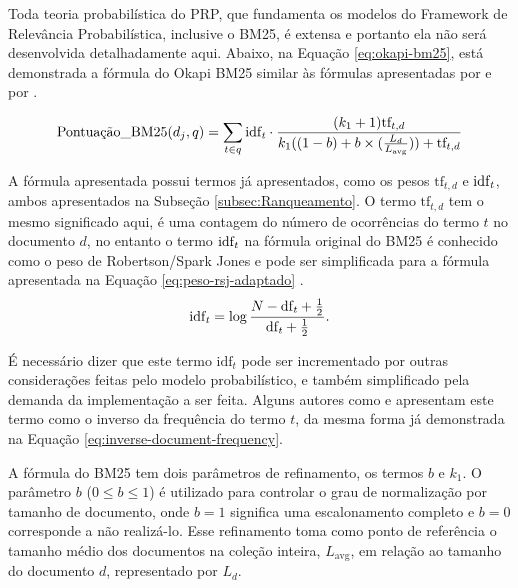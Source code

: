         Toda teoria probabilística do PRP, que fundamenta os modelos do Framework de Relevância Probabilística, inclusive o BM25, é extensa e portanto ela não será  desenvolvida detalhadamente aqui.
        Abaixo, na Equação \ref{eq:okapi-bm25}, está demonstrada a fórmula do Okapi BM25 similar às fórmulas apresentadas por  e por .
        
        \begin{equation}
            \label{eq:okapi-bm25}
    		\text{Pontuação\_BM25}(d_j, q) = \sum_{t \in q} \text{idf}_{\text{\textit{t}}} 
    		\cdot
    		\frac{(k_1 + 1) \text{tf}_{t,d}}{k_1((1-b)+b \times (\frac{L_d}{L_{\text{avg}}})) + \text{tf}_{t,d}} 
        \end{equation}
    
        A fórmula apresentada possui termos já apresentados, como os pesos $\text{tf}_{t,d}$ e $\text{idf}_{\text{\textit{t}}}$, ambos apresentados na Subseção \ref{subsec:Ranqueamento}.
        O termo $\text{tf}_{t,d}$ tem o mesmo significado aqui, é uma contagem do número de ocorrências do termo $t$ no documento $d$, no entanto o termo $\text{idf}_{\text{\textit{t}}}$ na fórmula original do BM25 é conhecido como o peso de Robertson/Spark Jones e pode ser simplificada para a fórmula apresentada na Equação \ref{eq:peso-rsj-adaptado} \cite[p.~347--349]{robertson_probabilistic_2010}.
        \begin{equation}
            \label{eq:peso-rsj-adaptado}
    		\text{idf}_{\text{\textit{t}}} = \log{\frac{N-\text{df}_{\text{\textit{t}}}+\frac{1}{2}}{\text{df}_{\text{\textit{t}}} + \frac{1}{2} }}.
        \end{equation}
        
        É necessário dizer que este termo $\text{idf}_{t}$ pode ser incrementado por outras considerações feitas pelo modelo probabilístico, e também simplificado pela demanda da implementação a ser feita.
        Alguns autores como  e  apresentam este termo como o inverso da frequência do termo $t$, da mesma forma já demonstrada na Equação \ref{eq:inverse-document-frequency}.
        
        A fórmula do BM25 tem dois parâmetros de refinamento, os termos $b$ e $k_1$. 
        O parâmetro $b$ ($0 \leq b \leq 1$) é utilizado para controlar o grau de normalização por tamanho de documento, onde $b=1$ significa uma escalonamento completo e $b=0$ corresponde a não realizá-lo. 
        Esse refinamento toma como ponto de referência o tamanho médio dos documentos na coleção inteira, $L_{\text{avg}}$, em relação ao tamanho do documento $d$, representado por $L_d$.
        
